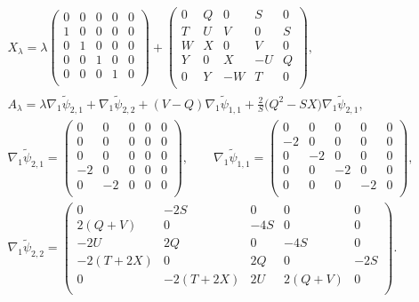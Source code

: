 \documentclass[10pt,a4paper]{amsart}
\numberwithin{equation}{section}
\begin{document}
\begin{gather*}
X_\lambda = \lambda \left(
\begin{matrix}
0 & 0 & 0 & 0 & 0 \\
1 & 0 & 0 & 0 & 0 \\
0 & 1 & 0 & 0 & 0 \\
0 & 0 & 1 & 0 & 0 \\
0 & 0 & 0 & 1 & 0 \\
\end{matrix}
\right) + \left(
\begin{matrix}
0 & Q & 0 & S & 0 \\
T & U & V & 0 & S \\
W & X & 0 & V & 0 \\
Y & 0 & X & -U & Q \\
0 & Y & -W & T & 0 \\
\end{matrix}
\right), \\
 A_\lambda = \lambda \nabla _1\widetilde{\psi}_{2,1}+\nabla _1\widetilde{\psi}_{2,2}
 +(V-Q) \nabla _1\widetilde{\psi}_{1,1} + \frac{2}{S}\big(Q^2-SX\big) \nabla _1\widetilde{\psi}_{2,1}, \\
\nabla _1\widetilde{\psi}_{2,1} = \left(
\begin{matrix}
0 & 0 & 0 & 0 & 0 \\
0 & 0 & 0 & 0 & 0 \\
0 & 0 & 0 & 0 & 0 \\
-2 & 0 & 0 & 0 & 0 \\
0 & -2 & 0 & 0 & 0 \\
\end{matrix}
\right),\qquad \nabla _1\widetilde{\psi}_{1,1}
= \left(
\begin{matrix}
0 & 0 & 0 & 0 & 0 \\
-2 & 0 & 0 & 0 & 0 \\
0 & -2 & 0 & 0 & 0 \\
0 & 0 & -2 & 0 & 0 \\
0 & 0 & 0 & -2 & 0 \\
\end{matrix}
\right), \\
 \nabla _1\widetilde{\psi}_{2,2}=\left(
\begin{matrix}
0&-2S &0 &0 &0 \\
2(Q+V)& 0 &-4S &0 &0 \\
-2U&2Q &0 &-4S &0 \\
-2(T+2X)&0 &2Q &0 &-2S \\
0&-2(T+2X) &2U &2(Q+V) &0 \\
\end{matrix}
\right).
\end{gather*}
\end{document}

